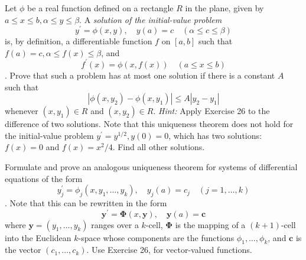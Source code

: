   \begin{exercise}[Rudin 5.27]
    Let $\phi$ be a real function defined on a rectangle $R$ in the plane, given by $a \le x \le b, \alpha \le y \le \beta$. A \textit{solution of the initial-value problem}
    \begin{equation}
      y^\prime = \phi(x, y), \quad y(a) = c \quad (\alpha \le c \le \beta)
    \end{equation}
    is, by definition, a differentiable function $f$ on $[a, b]$ such that $f(a) = c, \alpha \le f(x) \le \beta$, and
    \begin{equation}
      f^\prime(x) = \phi(x, f(x)) \quad (a \le x \le b)
    \end{equation}
   . Prove that such a problem has at most one solution if there is a constant $A$ such that
    \begin{equation}
      |\phi(x, y_2) - \phi(x, y_1)| \le A|y_2 - y_1|
    \end{equation}
    whenever $(x, y_1) \in R$ and $(x, y_2) \in R$. \textit{Hint:} Apply Exercise 26 to the difference of two solutions. Note that this uniqueness theorem does not hold for the initial-value problem $y^\prime = y^{1/2}, y(0) = 0$, which has two solutions: $f(x) = 0$ and $f(x) = x^2/4$. Find all other solutions.
  \end{exercise}
  \begin{solution}

  \end{solution}

  \begin{exercise}[Rudin 5.28]
    Formulate and prove an analogous uniqueness theorem for systems of differential equations of the form
    \begin{equation}
      y^\prime_j = \phi_j(x, y_1, \dots, y_k), \quad y_j(a) = c_j \quad (j = 1, \dots, k)
    \end{equation}
   . Note that this can be rewritten in the form
    \begin{equation}
      \mathbf{y}^\prime = \mathbf{\Phi}(x, \mathbf{y}), \quad \mathbf{y}(a) = \mathbf{c}
    \end{equation}
    where $\mathbf{y} = (y_1, \dots, y_k)$ ranges over a $k$-cell, $\mathbf{\Phi}$ is the mapping of a $(k+1)$-cell into the Euclidean $k$-space whose components are the functions $\phi_1, \dots, \phi_k$, and $\mathbf{c}$ is the vector $(c_1, \dots, c_k)$. Use Exercise 26, for vector-valued functions.
  \end{exercise}
  \begin{solution}

  \end{solution}

